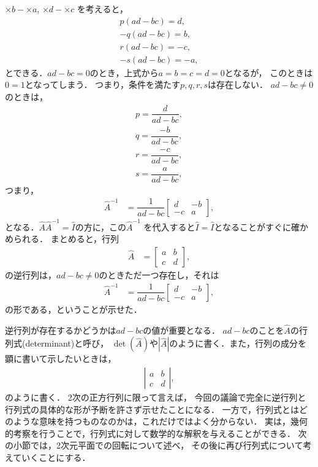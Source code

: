 $\times b -$$\times a$, 
$\times d -$$\times c$
を考えると，
\begin{align}
  p\left(ad - bc\right) =  d,\\
 -q\left(ad - bc\right) =  b,\\
  r\left(ad - bc\right) = -c,\\
 -s\left(ad - bc\right) = -a,
\end{align}
とできる．$ad-bc = 0$のとき，上式から$a=b=c=d=0$となるが，
このときは$0 = 1$となってしまう．
つまり，条件を満たす$p,q,r,s$は存在しない．
$ad - bc \neq 0$のときは，
\begin{align}
 p = \dfrac{d}{ad-bc},  \\
 q = \dfrac{-b}{ad-bc}, \\
 r = \dfrac{-c}{ad-bc}, \\
 s = \dfrac{a}{ad-bc}, 
\end{align}
つまり，
\begin{align}
\hat{A}^{-1} & =\dfrac{1}{ad-bc}\left[\begin{array}{cc}
d & -b\\
-c & a
\end{array}\right], 
\end{align}
となる．$\hat{A}\hat{A}^{-1} = \hat{I}$の方に，この$\hat{A}^{-1}$
を代入すると$\hat{I} = \hat{I}$となることがすぐに確かめられる．
まとめると，行列
\begin{align}
\hat{A} & =\left[\begin{array}{cc}
a & b\\
c & d
\end{array}\right],
\end{align}
の逆行列は，$ad - bc \neq 0$のときただ一つ存在し，それは
\begin{align}
\hat{A}^{-1} & =\dfrac{1}{ad-bc}\left[\begin{array}{cc}
d & -b\\
-c & a
\end{array}\right], 
\end{align}
の形である，ということが示せた．

逆行列が存在するかどうかは$ad - bc$の値が重要となる．
$ad-bc$のことを$\hat{A}$の行列式(determinant)と呼び，
$\det(\hat{A})$や$|\hat{A}|$のように書く．また，行列の成分を顕に書いて示したいときは，
\begin{align}
\left|\begin{array}{cc}
a & b\\
c & d
\end{array}\right|,
\end{align}
のように書く．
2次の正方行列に限って言えば，
今回の議論で完全に逆行列と行列式の具体的な形が予断を許さず示せたことになる．
一方で，行列式とはどのような意味を持つものなのかは，これだけではよく分からない．
実は，幾何的考察を行うことで，行列式に対して数学的な解釈を与えることができる．
%
次の小節では，2次元平面での回転について述べ，
その後に再び行列式について考えていくことにする．
%
